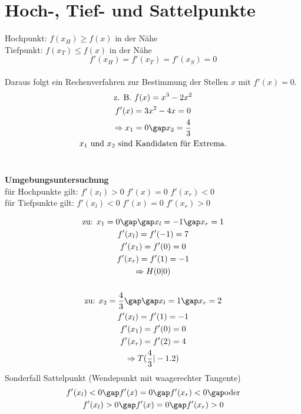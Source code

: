 \section{Hoch-, Tief- und Sattelpunkte}
Hochpunkt: $f(x_H) \geq f(x)$ in der Nähe \\
Tiefpunkt: $f(x_T) \leq f(x)$ in der Nähe \\
$$f'(x_H) = f'(x_T) = f'(x_S) = 0$$ \\
Daraus folgt ein Rechenverfahren zur Bestimmung der Stellen $x$ mit $f'(x) = 0$.
\begin{gather*}
  \text{z. B. } f(x) = x^3 - 2x^2 \\
  f'(x) = 3x^2 - 4x = 0 \\
  \Rightarrow x_1 = 0 \gap x_2 = \frac{4}{3} \\
  x_1 \text{ und } x_2 \text{ sind Kandidaten für Extrema.}
\end{gather*} \\
\begin{onepage}
  \textbf{Umgebungsuntersuchung} \\
  für Hochpunkte gilt: $f'(x_l) > 0$ $f'(x) = 0$ $f'(x_r) < 0$ \\ 
  für Tiefpunkte gilt: $f'(x_l) < 0$ $f'(x) = 0$ $f'(x_r) > 0$
\end{onepage}
\begin{gather*}
  \text{zu: } x_1 = 0 \gap\gap x_l = -1 \gap x_r = 1 \\
  f'(x_l) = f'(-1) = 7 \\
  f'(x_1) = f'(0) = 0 \\
  f'(x_r) = f'(1) = -1 \\
  \Rightarrow H(0|0) \\\\
  \text{zu: } x_2 = \frac{4}{3} \gap\gap x_l = 1 \gap x_r = 2 \\
  f'(x_l) = f'(1) = -1 \\
  f'(x_1) = f'(0) = 0 \\
  f'(x_r) = f'(2) = 4 \\
  \Rightarrow T(\frac{4}{3}|-1.2)
\end{gather*}
Sonderfall Sattelpunkt (Wendepunkt mit waagerechter Tangente)
\begin{gather*}
  f'(x_l) < 0 \gap f'(x) = 0 \gap f'(x_r) < 0 \gap \text{oder} \\
  f'(x_l) > 0 \gap f'(x) = 0 \gap f'(x_r) > 0
\end{gather*}
